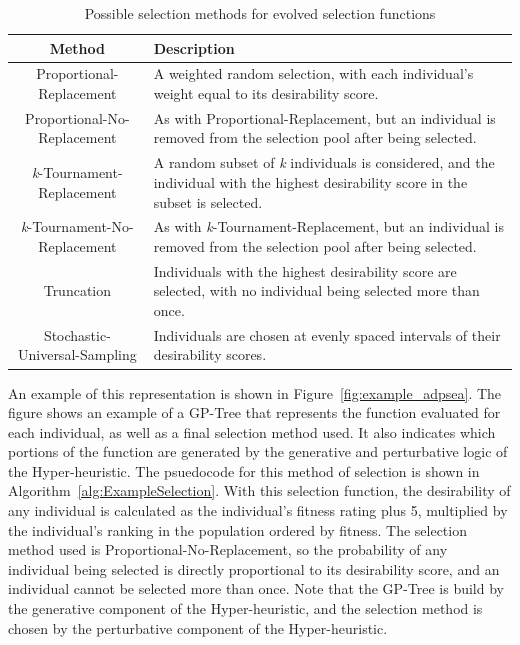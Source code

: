 \documentclass[sigconf]{acmart}
\begin{document}
\begin{table}
	\centering
	\caption{Possible selection methods for evolved selection functions}
	\label{tab:selection_methods}
	\begin{tabular}{c|p{4.5cm}}
		\hline
		Method & Description\\
		\hline
		Proportional-Replacement & A weighted random selection, with each individual's weight equal to its desirability score. \\
		\hline
		Proportional-No-Replacement & As with Proportional-Replacement, but an individual is removed from the selection pool after being selected.\\
		\hline
		\textit{k}-Tournament-Replacement& A random subset of \textit{k} individuals is considered, and the individual with the highest desirability score in the subset is selected. \\
		\hline
		\textit{k}-Tournament-No-Replacement & As with \textit{k}-Tournament-Replacement, but an individual is removed from the selection pool after being selected.\\
		\hline
		Truncation & Individuals with the highest desirability score are selected, with no individual being selected more than once. \\
		\hline
		Stochastic-Universal-Sampling & Individuals are chosen at evenly spaced intervals of their desirability scores. \\
		
		\hline
	\end{tabular}
\end{table}

An example of this representation is shown in Figure~\ref{fig:example_adpsea}. The figure shows an example of a GP-Tree that represents the function evaluated for each individual, as well as a final selection method used. It also indicates which portions of the function are generated by the generative and perturbative logic of the Hyper-heuristic. The psuedocode for this method of selection is shown in Algorithm~\ref{alg:ExampleSelection}. With this selection function, the desirability of any individual is calculated as the individual's fitness rating plus 5, multiplied by the individual's ranking in the population ordered by fitness. The selection method used is Proportional-No-Replacement, so the probability of any individual being selected is directly proportional to its desirability score, and an individual cannot be selected more than once. Note that the GP-Tree is build by the generative component of the Hyper-heuristic, and the selection method is chosen by the perturbative component of the Hyper-heuristic.
\end{document}
